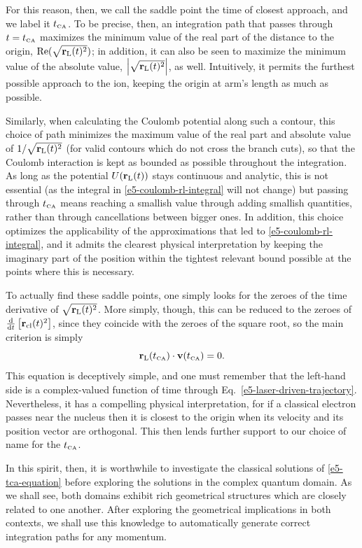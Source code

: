 For this reason, then, we call the saddle point the time of closest approach, and we label it ${t_{\scriptscriptstyle\mathrm{CA}}}$. To be precise, then, an integration path that passes through $t={t_{\scriptscriptstyle\mathrm{CA}}}$ maximizes the minimum value of the real part of the distance to the origin, $\Re(\sqrt{\vb{r}_\mathrm{L}(t)^2})$; in addition, it can also be seen to maximize the minimum value of the absolute value, $\left|\sqrt{\vb{r}_\mathrm{L}(t)^2}\right|$, as well. Intuitively, it permits the furthest possible approach to the ion, keeping the origin at arm's length as much as possible.

Similarly, when calculating the Coulomb potential along such a contour, this choice of path minimizes the maximum value of the real part and absolute value of $1/\sqrt{\vb{r}_\mathrm{L}(t)^2}$ (for valid contours which do not cross the branch cuts), so that the Coulomb interaction is kept as bounded as possible throughout the integration. As long as the potential $U(\vb{r}_\mathrm{L}(t))$ stays continuous and analytic, this is not essential (as the integral in \eqref{e5-coulomb-rl-integral} will not change) but passing through ${t_{\scriptscriptstyle\mathrm{CA}}}$ means reaching a smallish value through adding smallish quantities, rather than through cancellations between bigger ones. In addition, this choice optimizes the applicability of the approximations that led to \eqref{e5-coulomb-rl-integral}, and it admits the clearest physical interpretation by keeping the imaginary part of the position within the tightest relevant bound possible at the points where this is necessary.

To actually find these saddle points, one simply looks for the zeroes of the time derivative of $\sqrt{\vb{r}_\mathrm{L}(t)^2}$. More simply, though, this can be reduced to the zeroes of $\tfrac{\mathrm{d}}{\mathrm{d} t}\left[\vb{r}_{\mathrm{cl}}(t)^2\right]$, since they coincide with the zeroes of the square root, so the main criterion is simply
\begin{equation}
\vb{r}_\mathrm{L}({t_{\scriptscriptstyle\mathrm{CA}}})\cdot\vb{v}({t_{\scriptscriptstyle\mathrm{CA}}})=0.
\label{e5-tca-equation}
\end{equation}
This equation is deceptively simple, and one must remember that the left-hand side is a complex-valued function of time through Eq.~\eqref{e5-laser-driven-trajectory}. Nevertheless, it has a compelling physical interpretation, for if a classical electron passes near the nucleus then it is closest to the origin when its velocity and its position vector are orthogonal. This then lends further support to our choice of name for the ${t_{\scriptscriptstyle\mathrm{CA}}}$.

In this spirit, then, it is worthwhile to investigate the classical solutions of \eqref{e5-tca-equation} before exploring the solutions in the complex quantum domain. As we shall see, both domains exhibit rich geometrical structures which are closely related to one another. After exploring the geometrical implications in both contexts, we shall use this knowledge to automatically generate correct integration paths for any momentum.







